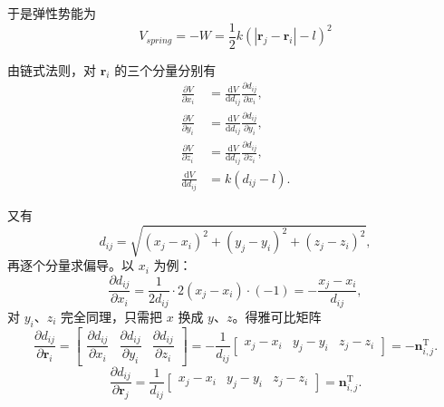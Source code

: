 \documentclass[fontset=fandol,12pt,a4paper]{ctexart}
\begin{document}
于是弹性势能为
\begin{equation}
	\label{eq:Vspring}
	V_{spring}=-W=\frac{1}{2} k\left(\left|\boldsymbol{r}_{j}-\boldsymbol{r}_{i}\right|-l\right)^{2}
\end{equation}

由链式法则，对
$\boldsymbol{r}_{i}$ 的三个分量分别有
\begin{equation}
	\label{eq:chainrule}
	\begin{aligned}
		\frac{\partial V}{\partial x_{i}} &= \frac{\mathrm{d} V}{\mathrm{d} d_{i j}} \frac{\partial d_{i j}}{\partial x_{i}}, \\
		\frac{\partial V}{\partial y_{i}} &= \frac{\mathrm{d} V}{\mathrm{d} d_{i j}} \frac{\partial d_{i j}}{\partial y_{i}}, \\
		\frac{\partial V}{\partial z_{i}} &= \frac{\mathrm{d} V}{\mathrm{d} d_{i j}} \frac{\partial d_{i j}}{\partial z_{i}}, \\
		\frac{\mathrm{d} V}{\mathrm{d} d_{i j}} &= k\left(d_{i j}-l\right).
	\end{aligned}
\end{equation}

又有
\begin{equation}
	\label{eq:distcomp}
	d_{i j}=\sqrt{\left(x_{j}-x_{i}\right)^{2}+\left(y_{j}-y_{i}\right)^{2}+\left(z_{j}-z_{i}\right)^{2}},
\end{equation}
再逐个分量求偏导。以 $x_{i}$ 为例：
\begin{equation}
	\label{eq:dx}
	\frac{\partial d_{i j}}{\partial x_{i}}
	=\frac{1}{2 d_{i j}} \cdot 2\left(x_{j}-x_{i}\right) \cdot(-1)
	=-\frac{x_{j}-x_{i}}{d_{i j}} ,
\end{equation}
对 $y_{i}$、$z_{i}$ 完全同理，只需把 $x$ 换成 $y$、$z$。得雅可比矩阵
\begin{equation}
	\label{eq:Jacobi}
	\frac{\partial d_{i j}}{\partial \boldsymbol{r}_{i}}
	=\begin{bmatrix}
		\dfrac{\partial d_{i j}}{\partial x_{i}} & \dfrac{\partial d_{i j}}{\partial y_{i}} & \dfrac{\partial d_{i j}}{\partial z_{i}}
	\end{bmatrix}
	=-\frac{1}{d_{i j}}
	\begin{bmatrix}
		x_{j}-x_{i} & y_{j}-y_{i} & z_{j}-z_{i}
	\end{bmatrix}
	=-\boldsymbol{n}_{i, j}^{\mathrm{T}} .
\end{equation}
\begin{equation}
	\label{eq:Jacobj}
	\frac{\partial d_{i j}}{\partial \boldsymbol{r}_{j}}
	=\frac{1}{d_{i j}}
	\begin{bmatrix}
		x_{j}-x_{i} & y_{j}-y_{i} & z_{j}-z_{i}
	\end{bmatrix}
	=\boldsymbol{n}_{i, j}^{\mathrm{T}} .
\end{equation}
\end{document}
